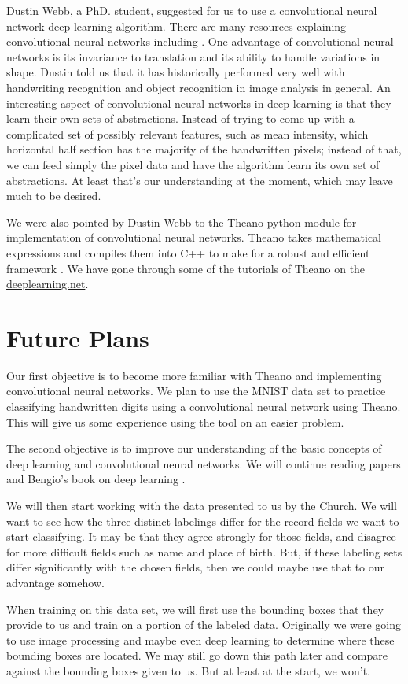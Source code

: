 \documentclass[12pt]{article}
\begin{document}
Dustin Webb, a PhD. student, suggested for us to use a convolutional neural network deep learning algorithm.  There are many resources explaining convolutional neural networks including \cite{Bengio-et-al-2015-Book} \cite{kavukcuoglu2010learning} \cite{krizhevsky2012imagenet}.  One advantage of convolutional neural networks is its invariance to translation and its ability to handle variations in shape.  Dustin told us that it has historically performed very well with handwriting recognition and object recognition in image analysis in general.  An interesting aspect of convolutional neural networks in deep learning is that they learn their own sets of abstractions.  Instead of trying to come up with a complicated set of possibly relevant features, such as mean intensity, which horizontal half section has the majority of the handwritten pixels; instead of that, we can feed simply the pixel data and have the algorithm learn its own set of abstractions.  At least that's our understanding at the moment, which may leave much to be desired.

We were also pointed by Dustin Webb to the Theano python module for implementation of convolutional neural networks.  Theano takes mathematical expressions and compiles them into C++ to make for a robust and efficient framework \cite{bergstra+al:2010-scipy}.  We have gone through some of the tutorials of Theano on the \href{http://www.deeplearning.net}{deeplearning.net}.

\section{Future Plans}

Our first objective is to become more familiar with Theano and implementing convolutional neural networks.  We plan to use the MNIST data set to practice classifying handwritten digits using a convolutional neural network using Theano.  This will give us some experience using the tool on an easier problem.

The second objective is to improve our understanding of the basic concepts of deep learning and convolutional neural networks.  We will continue reading papers and Bengio's book on deep learning \cite{Bengio-et-al-2015-Book}.

We will then start working with the data presented to us by the Church.  We will want to see how the three distinct labelings differ for the record fields we want to start classifying.  It may be that they agree strongly for those fields, and disagree for more difficult fields such as name and place of birth.  But, if  these labeling sets differ significantly with the chosen fields, then we could maybe use that to our advantage somehow.

When training on this data set, we will first use the bounding boxes that they provide to us and train on a portion of the labeled data.  Originally we were going to use image processing and maybe even deep learning to determine where these bounding boxes are located.  We may still go down this path later and compare against the bounding boxes given to us.  But at least at the start, we won't.




\end{document}

